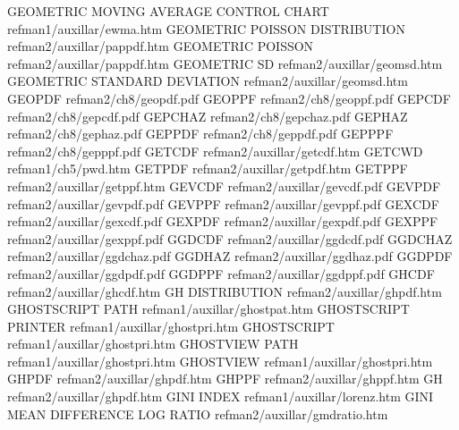 GEOMETRIC MOVING AVERAGE CONTROL CHART  refman1/auxillar/ewma.htm
GEOMETRIC POISSON DISTRIBUTION          refman2/auxillar/pappdf.htm
GEOMETRIC POISSON                       refman2/auxillar/pappdf.htm
GEOMETRIC SD                            refman2/auxillar/geomsd.htm
GEOMETRIC STANDARD DEVIATION            refman2/auxillar/geomsd.htm
GEOPDF                                  refman2/ch8/geopdf.pdf
GEOPPF                                  refman2/ch8/geoppf.pdf
GEPCDF                                  refman2/ch8/gepcdf.pdf
GEPCHAZ                                 refman2/ch8/gepchaz.pdf
GEPHAZ                                  refman2/ch8/gephaz.pdf
GEPPDF                                  refman2/ch8/geppdf.pdf
GEPPPF                                  refman2/ch8/gepppf.pdf
GETCDF                                  refman2/auxillar/getcdf.htm
GETCWD                                  refman1/ch5/pwd.htm
GETPDF                                  refman2/auxillar/getpdf.htm
GETPPF                                  refman2/auxillar/getppf.htm
GEVCDF                                  refman2/auxillar/gevcdf.pdf
GEVPDF                                  refman2/auxillar/gevpdf.pdf
GEVPPF                                  refman2/auxillar/gevppf.pdf
GEXCDF                                  refman2/auxillar/gexcdf.pdf
GEXPDF                                  refman2/auxillar/gexpdf.pdf
GEXPPF                                  refman2/auxillar/gexppf.pdf
GGDCDF                                  refman2/auxillar/ggdcdf.pdf
GGDCHAZ                                 refman2/auxillar/ggdchaz.pdf
GGDHAZ                                  refman2/auxillar/ggdhaz.pdf
GGDPDF                                  refman2/auxillar/ggdpdf.pdf
GGDPPF                                  refman2/auxillar/ggdppf.pdf
GHCDF                                   refman2/auxillar/ghcdf.htm
GH DISTRIBUTION                         refman2/auxillar/ghpdf.htm
GHOSTSCRIPT PATH                        refman1/auxillar/ghostpat.htm
GHOSTSCRIPT PRINTER                     refman1/auxillar/ghostpri.htm
GHOSTSCRIPT                             refman1/auxillar/ghostpri.htm
GHOSTVIEW PATH                          refman1/auxillar/ghostpri.htm
GHOSTVIEW                               refman1/auxillar/ghostpri.htm
GHPDF                                   refman2/auxillar/ghpdf.htm
GHPPF                                   refman2/auxillar/ghppf.htm
GH                                      refman2/auxillar/ghpdf.htm
GINI INDEX                              refman1/auxillar/lorenz.htm
GINI MEAN DIFFERENCE LOG RATIO          refman2/auxillar/gmdratio.htm
